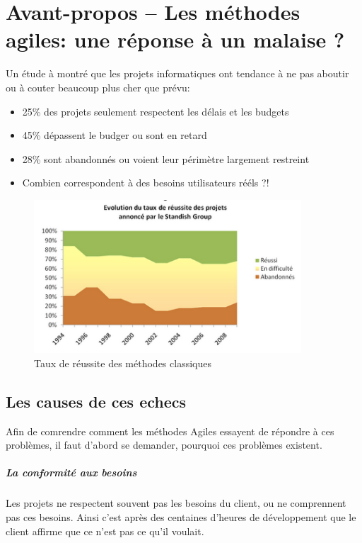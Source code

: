 \chapter*{Avant-propos -- Les méthodes agiles: une réponse à un malaise ?}\label{avantPropos}
	\nouveauChapitre
	Un étude à montré que les projets informatiques ont tendance à ne pas aboutir ou à couter beaucoup plus cher que prévu: 
	\begin{itemize}
		\item 25\% des projets seulement respectent les délais et les budgets
		\item 45\% dépassent le budger ou sont en retard
		\item 28\% sont abandonnés ou voient leur périmètre largement restreint
		\item Combien correspondent à des besoins utilisateurs rééls ?!
	\end{itemize}
	\vspace{3cm}
		\begin{figure}[H]
			\center
		\includegraphics[width=10cm]{images/7-tauxReussite.png}
			\caption{Taux de réussite des méthodes classiques}
		\end{figure}
		\newpage
	\section*{Les causes de ces echecs}
	Afin de comrendre comment les méthodes Agiles essayent de répondre à ces problèmes, il faut d'abord se demander, pourquoi ces problèmes existent.
	\paragraph{La conformité aux besoins} Les projets ne respectent souvent pas les besoins du client, ou ne comprennent pas ces besoins. Ainsi c'est après des centaines d'heures de développement que le client
	affirme que ce n'est pas ce qu'il voulait.

